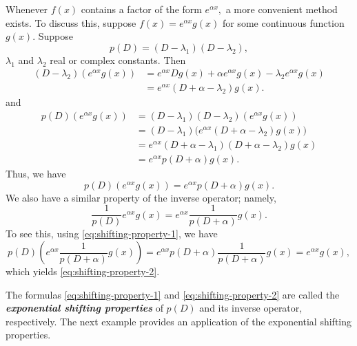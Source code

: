 Whenever $f(x)$ contains a factor of the form $e^{\alpha x},$  a more convenient method exists.  To discuss this, suppose $f(x) = e^{\alpha x} g(x)$ for some continuous function $g(x).$ Suppose 
\[p(D) = (D-\lambda_1) (D-\lambda_2),\] $\lambda_1$ and $\lambda_2$ real or complex constants.
Then
\[\begin{split}
(D-\lambda_2)(e^{\alpha x} g(x)) & = e^{\alpha x} Dg(x)+\alpha e^{\alpha x} g(x)- \lambda_2 e^{\alpha x} g(x)\\
	&=e^{\alpha x}  (D+\alpha-\lambda_2)g(x).
\end{split}\]
and 
\[\begin{split}
	p(D)(e^{\alpha x} g(x))&=(D-\lambda_1)(D-\lambda_2) (e^{\alpha x} g(x))\\
	 &=(D-\lambda_1)\big(e^{\alpha x}  (D+\alpha-\lambda_2)g(x)\big)\\
	&=e^{\alpha x} (D+\alpha-\lambda_1)(D+\alpha-\lambda_2)g(x)\\
	&= e^{\alpha x} p(D+\alpha)g(x).
\end{split}\]
Thus, we have
\begin{equation}\label{eq:shifting-property-1}
	p(D)(e^{\alpha x} g(x)) =e^{\alpha x} p(D+\alpha)g(x).
\end{equation}
We also have a similar property of the inverse operator; namely,
\begin{equation}\label{eq:shifting-property-2}
	\frac{1}{p(D)} e^{\alpha x} g(x) = e^{\alpha x}\frac{1}{p(D+\alpha)}g(x).
\end{equation} To see this, using \eqref{eq:shifting-property-1}, we have 
\[p(D)\left(e^{\alpha x}\frac{1}{p(D+\alpha)}g(x)\right) =e^{\alpha x}p(D+\alpha) \frac{1}{p(D+\alpha)}g(x)= e^{\alpha x}g(x),\] which yields \eqref{eq:shifting-property-2}.

The formulas \eqref{eq:shifting-property-1} and \eqref{eq:shifting-property-2} are called the  \textit{\textbf{exponential shifting properties}} of $p(D)$ and its inverse operator, respectively.
The next example provides an  application of the exponential shifting properties.

